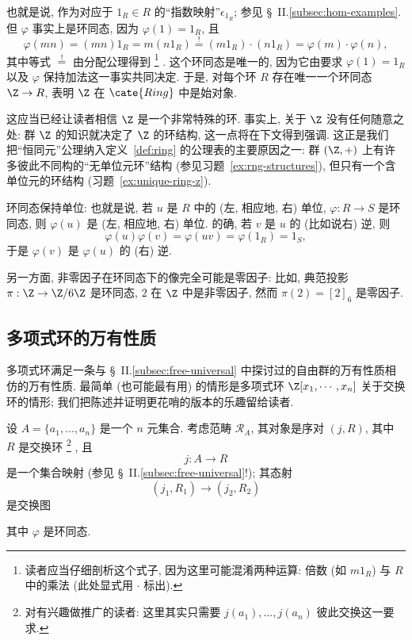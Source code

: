 也就是说, 作为对应于 $1_R \in R$ 的``指数映射''$\epsilon_{1_R}$; 参见 \S~II.\ref{subsec:hom-examples}. 但 $\varphi$ 事实上是环同态, 因为 $\varphi(1) = 1_R$, 且
\[
\varphi(mn) = (mn)1_R = m(n 1_R) \overset{!}{=} (m 1_R) \cdot (n 1_R) = \varphi(m) \cdot \varphi(n),
\]
其中等式 $\overset{!}{=}$ 由分配公理得到%
\footnote{读者应当仔细剖析这个式子, 因为这里可能混淆两种运算: 倍数 (如 $m 1_R$) 与 $R$ 中的乘法 (此处显式用 $\cdot$ 标出).}%
. 这个环同态是唯一的, 因为它由要求 $\varphi(1) = 1_R$ 以及 $\varphi$ 保持加法这一事实共同决定. 于是, 对每个环 $R$ 存在唯一一个环同态 $\Z \to R$, 表明 $\Z$ 在 $\cate{Ring}$ 中是始对象.

这应当已经让读者相信 $\Z$ 是一个非常特殊的环. 事实上, 关于 $\Z$ 没有任何随意之处: 群 $\Z$ 的知识就决定了 $\Z$ 的环结构, 这一点将在下文得到强调. 这正是我们把``恒同元''公理纳入定义~\ref{def:ring} 的公理表的主要原因之一: 群 $(\Z, +)$ 上有许多彼此不同构的``无单位元环''结构 (参见习题~\ref{ex:rng-structures}), 但只有一个含单位元的环结构 (习题~\ref{ex:unique-ring-z}).

环同态保持单位: 也就是说, 若 $u$ 是 $R$ 中的 (左, 相应地, 右) 单位, $\varphi : R \to S$ 是环同态, 则 $\varphi(u)$ 是 (左, 相应地, 右) 单位. 的确, 若 $v$ 是 $u$ 的 (比如说右) 逆, 则
\[
\varphi(u)\varphi(v) = \varphi(uv) = \varphi(1_R) = 1_S,
\]
于是 $\varphi(v)$ 是 $\varphi(u)$ 的 (右) 逆.

另一方面, 非零因子在环同态下的像完全可能是零因子: 比如, 典范投影 $\pi : \Z \to \Z/6\Z$ 是环同态, $2$ 在 $\Z$ 中是非零因子, 然而 $\pi(2) = [2]_6$ 是零因子.

\subsection{多项式环的万有性质}
\label{subsec:poly-universal}

多项式环满足一条与 \S~II.\ref{subsec:free-universal} 中探讨过的自由群的万有性质相仿的万有性质. 最简单 (也可能最有用) 的情形是多项式环 $\Z[x_1, \cdots, x_n]$ 关于交换环的情形; 我们把陈述并证明更花哨的版本的乐趣留给读者.

设 $A = \{a_1, \ldots, a_n\}$ 是一个 $n$ 元集合. 考虑范畴 $\mathscr{R}_A$, 其对象是序对 $(j, R)$, 其中 $R$ 是交换环%
\footnote{对有兴趣做推广的读者: 这里其实只需要 $j(a_1), \ldots, j(a_n)$ 彼此交换这一要求.}%
, 且
\[
j : A \to R
\]
是一个集合映射 (参见 \S~II.\ref{subsec:free-universal}!); 其态射
\[
(j_1, R_1) \rightarrow (j_2, R_2)
\]
是交换图
\begin{center}
\end{center}
其中 $\varphi$ 是环同态.

